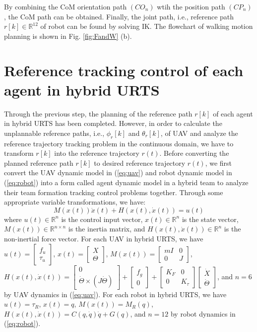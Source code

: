 \documentclass{ieeeaccess}
\begin{document}
By combining the CoM orientation path $(CO_n)$ wtih the position path $(CP_n)$, the CoM path can be obtained. Finally, the joint path, i.e., reference path $r[k]\in\mathbb{R}^{12}$ of robot can be found by solving IK. The flowchart of walking motion planning is shown in Fig. \ref{fig:FandW} (b).

\section{Reference tracking control of each agent in hybrid URTS}
Through the previous step, the planning of the reference path $r[k]$ of each agent in hybrid URTS has been completed. However, in order to calculate the unplannable reference paths, i.e., $\phi_r[k]$ and $\theta_r[k]$, of UAV and analyze the reference trajectory tracking problem in the continuous domain, we have to transform $r[k]$ into the reference trajectory $r(t)$. Before converting the planned reference path $r[k]$ to desired reference trajectory $r(t)$, we first convert the UAV dynamic model in (\ref{eq:uav}) and robot dynamic model in (\ref{eq:robot}) into a form called agent dynamic model in a hybrid team to analyze their team formation tracking control problems together. Through some appropriate variable transformations, we have:
\begin{equation} \label{eq:agent} 
    M(x(t))\ddot{x}(t) + H(x(t),\dot{x}(t)) = u(t)
\end{equation}
where $u(t)\in\mathbb{R}^n$ is the control input vector, $x(t)\in\mathbb{R}^n$ is the state vector, $M(x(t))\in\mathbb{R}^{n\times n}$ is the inertia matrix, and $H(x(t),\dot{x}(t))\in\mathbb{R}^n$ is the non-inertial force vector. For each UAV in hybrid URTS, we have $u(t)=\begin{bmatrix}
    f_u \\ \tau_u
\end{bmatrix}$, $x(t)=\begin{bmatrix}
    X \\ \Theta
\end{bmatrix}$, $M(x(t))=\begin{bmatrix}
    mI & 0 \\ 0 & J
\end{bmatrix}$, $H(x(t),\dot{x}(t))=\begin{bmatrix}
    0 \\ \dot{\Theta}\times(J\dot{\Theta})
\end{bmatrix}+\begin{bmatrix}
    f_g \\ 0
\end{bmatrix}+\begin{bmatrix}
    K_F & 0 \\
    0 & K_\tau
\end{bmatrix}\begin{bmatrix}
    \dot{X} \\ \dot{\Theta}
\end{bmatrix}$, and $n=6$ by UAV dynamics in (\ref{eq:uav}). For each robot in hybrid URTS, we have $u(t)=\tau_R$, $x(t)=q$, $M(x(t))=M_R(q)$, $H(x(t),\dot{x}(t))=C(q,\dot{q})\dot{q} + G(q)$, and $n=12$ by robot dynamics in (\ref{eq:robot}).
\end{document}

